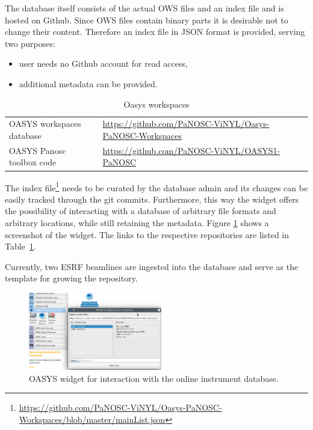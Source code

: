 \documentclass[10pt]{scrartcl}
\begin{document}
The database itself consists of the actual OWS files and an index file and is hosted on Github. Since OWS files contain binary parts it is desirable not to change their content. Therefore an index file in JSON format is provided, serving two purposes:
\begin{itemize}
    \item user needs no Github account for read access,
    \item additional metadata can be provided.
\end{itemize}

\begin{table}[ht]
  \centering
  \caption{Oasys workspaces}
  \label{tab:oasys_workspaces}
  \begin{center}
    \begin{tabular}{ll}
      \hline
      OASYS workspaces database & \url{https://github.com/PaNOSC-ViNYL/Oasys-PaNOSC-Workspaces} \\
      OASYS Panosc toolbox code & \url{https://github.com/PaNOSC-ViNYL/OASYS1-PaNOSC} \\
      \hline
    \end{tabular}
  \end{center}
\end{table}


The index
file\footnote{\url{https://github.com/PaNOSC-ViNYL/Oasys-PaNOSC-Workspaces/blob/master/mainList.json}}
needs to be curated by the database admin and its changes can be easily tracked
through the git commits. Furthermore, this way the widget offers the possibility
of interacting with a database of arbitrary file formats and arbitrary
locations, while still retaining the metadata. Figure \ref{fig:oasys_database}
shows a screenshot of the widget. The links to the respective repositories are
listed in Table~\ref{tab:oasys_workspaces}.

Currently, two ESRF beamlines are ingested into the database and serve as the template for growing the repository.

\begin{figure}[ht]
    \centering
    \includegraphics[width=0.52\textwidth]{figures/oasys_database_widget.png}
    \caption{OASYS widget for interaction with the online instrument database.}
    \label{fig:oasys_database}
\end{figure}
\end{document}
